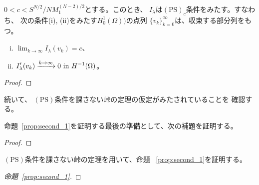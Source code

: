 \begin{lem}
 $0 < c < S^{N/2}/NM_1^{(N-2)/2}$とする。このとき、
 $I_\lambda$は$(\mathrm{PS})_c$条件をみたす。すなわち、
 次の条件(i), (ii)をみたす$H_0^1(\Omega))$の点列
 $\{ v_k \}_{k = 0}^\infty$は、収束する部分列をもつ。
 \begin{enumerate}[(i)]
  \item $\displaystyle \lim_{k \to \infty} I_\lambda (v_k) = c$、
  \item $\displaystyle I^\prime_\lambda (v_k) \xrightarrow{k \to
        \infty} 0 ~\text{in}~ H^{-1}(\Omega)$。
 \end{enumerate}
\end{lem}

\begin{proof}
 
\end{proof}

続いて、
$(\mathrm{PS})$条件を課さない峠の定理の仮定がみたされていることを
確認する。

\begin{lem}
 
\end{lem}

命題~\ref{prop:second_1}を証明する最後の準備として、次の補題を証明する。

\begin{lem} \label{lem:mountain_dec}
 
\end{lem}

\begin{proof}
 
\end{proof}

$(\mathrm{PS})$条件を課さない峠の定理を用いて、命題
~\ref{prop:second_1}を証明する。

\begin{proof}[命題~\ref{prop:second_1}]
 
\end{proof}

